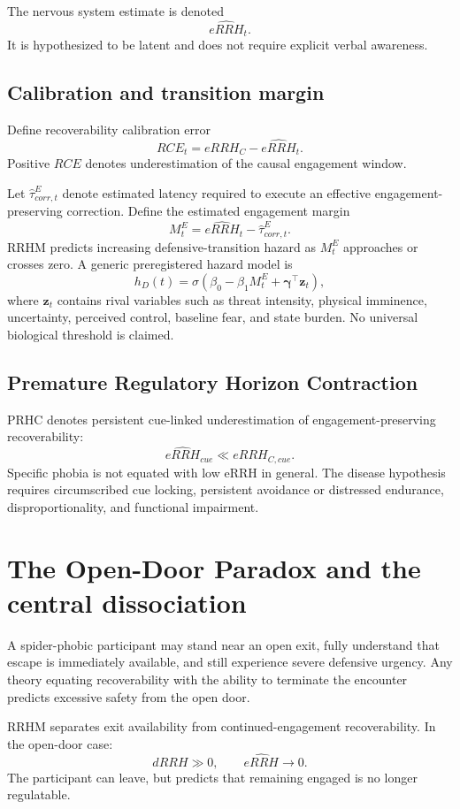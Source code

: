 \documentclass[9pt,twocolumn]{article}
\begin{document}
The nervous system estimate is denoted
\[
\widehat{eRRH}_t.
\]
It is hypothesized to be latent and does not require explicit verbal awareness.

\subsection{Calibration and transition margin}
Define recoverability calibration error
\[
RCE_t=eRRH_C-\widehat{eRRH}_t.
\]
Positive $RCE$ denotes underestimation of the causal engagement window.

Let $\widehat{\tau}^{E}_{corr,t}$ denote estimated latency required to execute an effective engagement-preserving correction. Define the estimated engagement margin
\[
M_t^E=\widehat{eRRH}_t-\widehat{\tau}^{E}_{corr,t}.
\]
RRHM predicts increasing defensive-transition hazard as $M_t^E$ approaches or crosses zero. A generic preregistered hazard model is
\[
h_D(t)=\sigma\!\left(\beta_0-\beta_1M_t^E+\boldsymbol\gamma^{\top}\mathbf z_t\right),
\]
where $\mathbf z_t$ contains rival variables such as threat intensity, physical imminence, uncertainty, perceived control, baseline fear, and state burden. No universal biological threshold is claimed.

\subsection{Premature Regulatory Horizon Contraction}
PRHC denotes persistent cue-linked underestimation of engagement-preserving recoverability:
\[
\widehat{eRRH}_{cue}\ll eRRH_{C,cue}.
\]
Specific phobia is not equated with low eRRH in general. The disease hypothesis requires circumscribed cue locking, persistent avoidance or distressed endurance, disproportionality, and functional impairment.

\section{The Open-Door Paradox and the central dissociation}
A spider-phobic participant may stand near an open exit, fully understand that escape is immediately available, and still experience severe defensive urgency. Any theory equating recoverability with the ability to terminate the encounter predicts excessive safety from the open door.

RRHM separates exit availability from continued-engagement recoverability. In the open-door case:
\[
 dRRH\gg0,\qquad \widehat{eRRH}\rightarrow0.
\]
The participant can leave, but predicts that remaining engaged is no longer regulatable.
\end{document}
